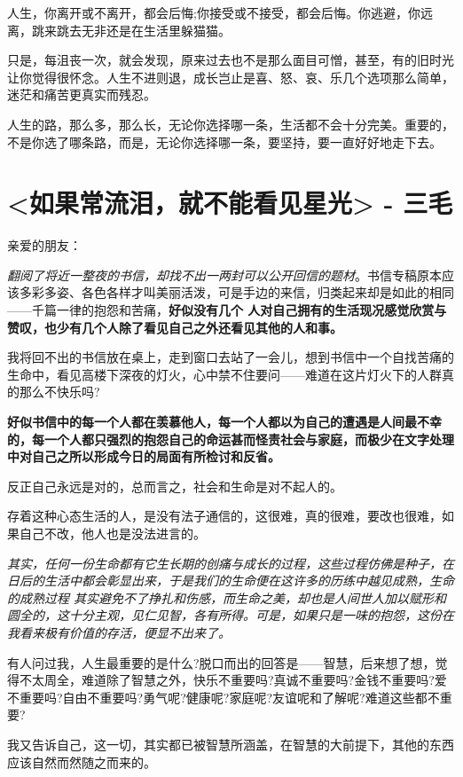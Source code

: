 \documentclass[UTF8,a4paper,8pt]{ctexbook}
\begin{document}
	 人生，你离开或不离开，都会后悔;你接受或不接受，都会后悔。你逃避，你远离，跳来跳去无非还是在生活里躲猫猫。
	 
	 只是，每沮丧一次，就会发现，原来过去也不是那么面目可憎，甚至，有的旧时光让你觉得很怀念。人生不进则退，成长岂止是喜、怒、哀、乐几个选项那么简单，迷茫和痛苦更真实而残忍。
	 
	 人生的路，那么多，那么长，无论你选择哪一条，生活都不会十分完美。重要的，不是你选了哪条路，而是，无论你选择哪一条，要坚持，要一直好好地走下去。
	 

\newpage
\section{<如果常流泪，就不能看见星光> - 三毛}

	亲爱的朋友：
	
	\textit{翻阅了将近一整夜的书信，却找不出一两封可以公开回信的题材}。书信专稿原本应该多彩多姿、各色各样才叫美丽活泼，可是手边的来信，归类起来却是如此的相同——千篇一律的抱怨和苦痛，\textbf{好似没有几个 人对自己拥有的生活现况感觉欣赏与赞叹，也少有几个人除了看见自己之外还看见其他的人和事。}
	
	我将回不出的书信放在桌上，走到窗口去站了一会儿，想到书信中一个自找苦痛的生命中，看见高楼下深夜的灯火，心中禁不住要问——难道在这片灯火下的人群真的那么不快乐吗?
	
	\textbf{好似书信中的每一个人都在羡慕他人，每一个人都以为自己的遭遇是人间最不幸的，每一个人都只强烈的抱怨自己的命运甚而怪责社会与家庭，而极少在文字处理中对自己之所以形成今日的局面有所检讨和反省。}
	
	反正自己永远是对的，总而言之，社会和生命是对不起人的。
	
	存着这种心态生活的人，是没有法子通信的，这很难，真的很难，要改也很难，如果自己不改，他人也是没法进言的。
	
	\textit{其实，任何一份生命都有它生长期的创痛与成长的过程，这些过程仿佛是种子，在日后的生活中都会彰显出来，于是我们的生命便在这许多的历练中越见成熟，生命的成熟过程 其实避免不了挣扎和伤感，而生命之美，却也是人间世人加以赋形和圆全的，这十分主观，见仁见智，各有所得。可是，如果只是一味的抱怨，这份在我看来极有价值的存活，便显不出来了。}
	
	有人问过我，人生最重要的是什么?脱口而出的回答是——智慧，后来想了想，觉得不太周全，难道除了智慧之外，快乐不重要吗?真诚不重要吗?金钱不重要吗?爱不重要吗?自由不重要吗?勇气呢?健康呢?家庭呢?友谊呢和了解呢?难道这些都不重要?
	
	我又告诉自己，这一切，其实都已被智慧所涵盖，在智慧的大前提下，其他的东西应该自然而然随之而来的。
	
\end{document}
